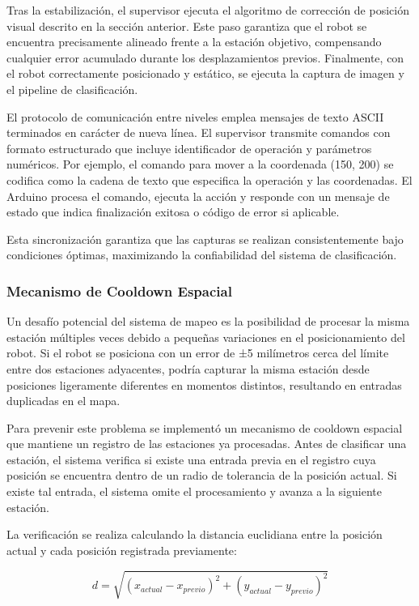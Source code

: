 Tras la estabilización, el supervisor ejecuta el algoritmo de corrección de posición visual descrito en la sección anterior. Este paso garantiza que el robot se encuentra precisamente alineado frente a la estación objetivo, compensando cualquier error acumulado durante los desplazamientos previos. Finalmente, con el robot correctamente posicionado y estático, se ejecuta la captura de imagen y el pipeline de clasificación.

El protocolo de comunicación entre niveles emplea mensajes de texto ASCII terminados en carácter de nueva línea. El supervisor transmite comandos con formato estructurado que incluye identificador de operación y parámetros numéricos. Por ejemplo, el comando para mover a la coordenada (150, 200) se codifica como la cadena de texto que especifica la operación y las coordenadas. El Arduino procesa el comando, ejecuta la acción y responde con un mensaje de estado que indica finalización exitosa o código de error si aplicable.

Esta sincronización garantiza que las capturas se realizan consistentemente bajo condiciones óptimas, maximizando la confiabilidad del sistema de clasificación.

\subsubsection{Mecanismo de Cooldown Espacial}

Un desafío potencial del sistema de mapeo es la posibilidad de procesar la misma estación múltiples veces debido a pequeñas variaciones en el posicionamiento del robot. Si el robot se posiciona con un error de ±5 milímetros cerca del límite entre dos estaciones adyacentes, podría capturar la misma estación desde posiciones ligeramente diferentes en momentos distintos, resultando en entradas duplicadas en el mapa.

Para prevenir este problema se implementó un mecanismo de cooldown espacial que mantiene un registro de las estaciones ya procesadas. Antes de clasificar una estación, el sistema verifica si existe una entrada previa en el registro cuya posición se encuentra dentro de un radio de tolerancia de la posición actual. Si existe tal entrada, el sistema omite el procesamiento y avanza a la siguiente estación.

La verificación se realiza calculando la distancia euclidiana entre la posición actual y cada posición registrada previamente:

\begin{equation}
d = \sqrt{(x_{actual} - x_{previo})^2 + (y_{actual} - y_{previo})^2}
\end{equation}


